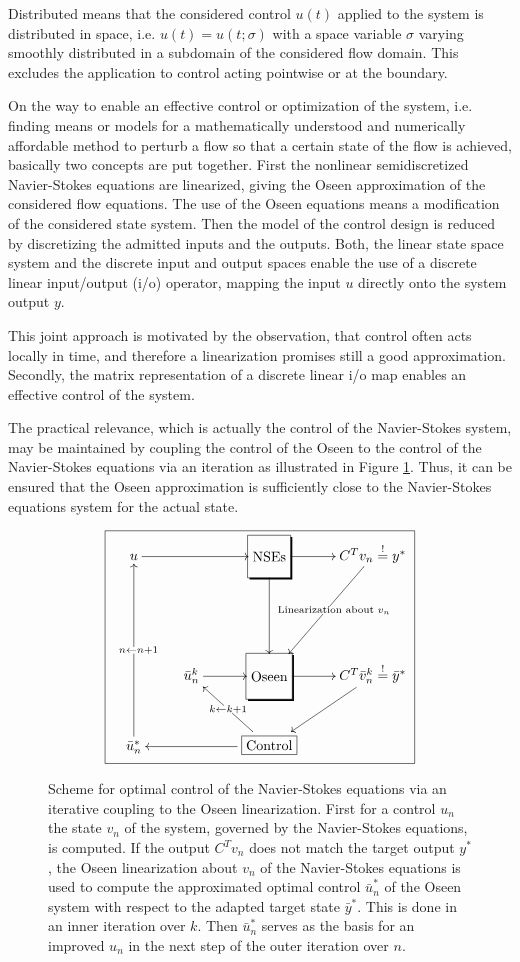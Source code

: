 \documentclass[a4paper,10pt,BCOR=15mm]{scrbook}
\begin{document}
 Distributed means that the considered control $u(t)$ applied to the system is distributed in space, i.e. $u(t) = u(t;\sigma)$ with a space variable $\sigma$ varying smoothly distributed in a subdomain of the considered flow domain. This excludes the application to control acting pointwise or at the boundary. 

On the way to enable an effective control or optimization of the system, i.e. finding means or models for a mathematically understood and numerically affordable method to perturb a flow so that a certain state of the flow is achieved, basically two concepts are put together. First the nonlinear semidiscretized Navier-Stokes equations are linearized, giving the Oseen approximation of the considered flow equations. The use of the Oseen equations means a modification of the considered state system. Then the model of the control design is reduced by discretizing the admitted inputs and the outputs. Both, the linear state space system and the discrete input and output spaces enable the use of a discrete linear input/output (i/o) operator, mapping the input $u$ directly onto the system output $y$.

This joint approach is motivated by the observation, that control often acts locally in time, and therefore a linearization promises still a good approximation. Secondly, the matrix representation of a discrete linear i/o map enables an effective control of the system. 

The practical relevance, which is actually the control of the Navier-Stokes system, may be maintained by coupling the control of the Oseen to the control of the Navier-Stokes equations via an iteration as illustrated in Figure \ref{optscheme}. Thus, it can be ensured that the Oseen approximation is sufficiently close to the Navier-Stokes equations system for the actual state.

\begin{figure}[htbp]
\begin{equation*}
\boxed{
 \xymatrix{
u  \ar[rr] & &*+=[F-,]\txt{~NSEs~ }\ar[dd] \ar[r] &C^Tv_n \stackrel{!}{=}y^* \ar[ddl]|-{\text{~~~~Linearization about $v_n$}}  \\  & & & \\
 & \bar u_n^k \ar[r] &*+=[F-,]\txt{~Oseen~ } \ar[r] &C^T\bar v_n^k \stackrel{!}{=}\bar y^* \ar[ld] \\
\bar u_{n}^* \ar[uuu]|- {~~n \leftarrow n+1} & &\framebox{Control} \ar [ll] \ar[lu]|- {k \leftarrow k+1 }  &
}
}
\end{equation*}
\caption{Scheme for optimal control of the Navier-Stokes equations via an iterative coupling to the Oseen linearization. First for a control $u_n$ the state $v_n$ of the system, governed by the Navier-Stokes equations, is computed. If the output $C^Tv_n$ does not match the target output $y^*$, the Oseen linearization about $v_n$ of the Navier-Stokes equations is used to compute the approximated optimal control $\bar u_{n}^*$ of the Oseen system with respect to the adapted target state $\bar y^*$. This is done in an inner iteration over $k$. Then $\bar u_{n}^*$ serves as the basis for an improved $u_n$ in the next step of the outer iteration over $n$.}
\label{optscheme}
\end{figure}
\end{document}
